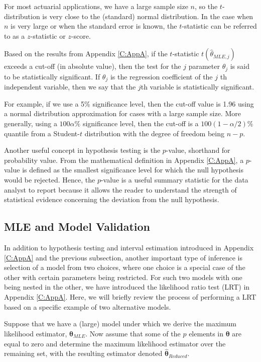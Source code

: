 \documentclass[]{book}
\theoremstyle{definition}
\theoremstyle{definition}
\theoremstyle{definition}
\theoremstyle{remark}
\begin{document}
For most actuarial applications, we have a large sample size \(n\), so
the \(t\)-distribution is very close to the (standard) normal
distribution. In the case when \(n\) is very large or when the standard
error is known, the \(t\)-statistic can be referred to as a
\(z\)-statistic or \(z\)-score.

Based on the results from Appendix \ref{C:AppA}, if the \(t\)-statistic
\(t(\hat{\theta}_{MLE,j})\) exceeds a cut-off (in absolute value), then
the test for the \(j\) parameter \(\theta_j\) is said to be
statistically significant. If \(\theta_j\) is the regression coefficient
of the \(j\) th independent variable, then we say that the \(j\)th
variable is statistically significant.

For example, if we use a 5\% significance level, then the cut-off value
is 1.96 using a normal distribution approximation for cases with a large
sample size. More generally, using a \(100 \alpha \%\) significance
level, then the cut-off is a \(100(1-\alpha/2)\%\) quantile from a
Student-\(t\) distribution with the degree of freedom being \(n-p\).

Another useful concept in hypothesis testing is the \(p\)-value,
shorthand for probability value. From the mathematical definition in
Appendix \ref{C:AppA}, a \(p\)-value is defined as the smallest
significance level for which the null hypothesis would be rejected.
Hence, the \(p\)-value is a useful summary statistic for the data
analyst to report because it allows the reader to understand the
strength of statistical evidence concerning the deviation from the null
hypothesis.

\subsection{MLE and Model Validation}\label{S:AppC:MLEModelVal}

In addition to hypothesis testing and interval estimation introduced in
Appendix \ref{C:AppA} and the previous subsection, another important
type of inference is selection of a model from two choices, where one
choice is a special case of the other with certain parameters being
restricted. For such two models with one being nested in the other, we
have introduced the likelihood ratio test (LRT) in Appendix
\ref{C:AppA}. Here, we will briefly review the process of performing a
LRT based on a specific example of two alternative models.

Suppose that we have a (large) model under which we derive the maximum
likelihood estimator, \(\hat{\boldsymbol{\theta}}_{MLE}\). Now assume
that some of the \(p\) elements in \(\boldsymbol \theta\) are equal to
zero and determine the maximum likelihood estimator over the remaining
set, with the resulting estimator denoted
\(\hat{\boldsymbol{\theta}}_{Reduced}\).
\end{document}

